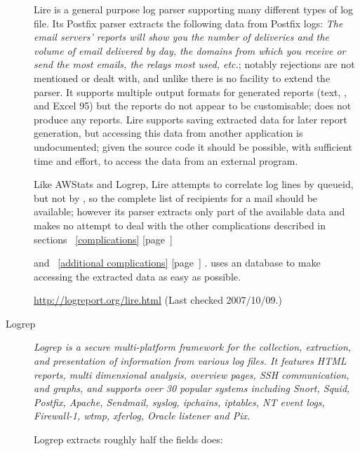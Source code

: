 \documentclass[a4paper,12pt,draft]{article}
\newcommand{\parsername}{\PLP{}}
\newcommand{\refwithpage}[1]{%
    \empty{}\ref{#1} [page~\pageref{#1}]%
}
\begin{document}
\begin{description}
        Lire is a general purpose log parser supporting many different
        types of log file.  Its Postfix parser extracts the following data
        from Postfix logs: \textit{The email servers' reports will show you
        the number of deliveries and the volume of email delivered by day,
        the domains from which you receive or send the most emails, the
        relays most used, etc.\/}; notably rejections are not mentioned or
        dealt with, and unlike \parsername{} there is no facility to extend
        the parser.  It supports multiple output formats for generated
        reports (text, \HTML{}, \PDF{} and Excel 95) but the reports do not
        appear to be customisable; \parsername{} does not produce any
        reports.  Lire supports saving extracted data for later report
        generation, but accessing this data from another application is
        undocumented; given the source code it should be possible, with
        sufficient time and effort, to access the data from an external
        program.

        Like AWStats and Logrep, Lire attempts to correlate log lines by
        queueid, but not by \pid{}, so the complete list of recipients for
        a mail should be available; however its parser extracts only part
        of the available data and makes no attempt to deal with the other
        complications described in sections~\refwithpage{complications}
        and~\refwithpage{additional complications}.  \parsername{} uses an
        \SQL{} database to make accessing the extracted data as easy as
        possible.

        \url{http://logreport.org/lire.html} \newline (Last checked
        2007/10/09.)

    \item [Logrep] \textit{Logrep is a secure multi-platform framework for
        the collection, extraction, and presentation of information from
        various log files. It features HTML reports, multi dimensional
        analysis, overview pages, SSH communication, and graphs, and
        supports over 30 popular systems including Snort, Squid, Postfix,
        Apache, Sendmail, syslog, ipchains, iptables, NT event logs,
        Firewall-1, wtmp, xferlog, Oracle listener and Pix.\/}

        Logrep extracts roughly half the fields \parsername{} does:

        \begin{itemize}


\end{itemize}
\end{description}
\end{document}

